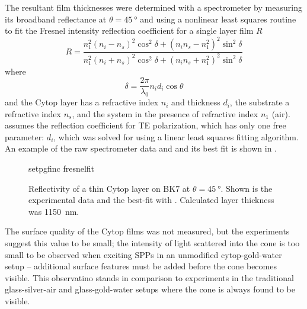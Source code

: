 The resultant film thicknesses were determined with a spectrometer by
measuring its broadband reflectance at $\theta=\SI{45}{\degree}$ and using
a nonlinear least squares routine~\cite{more1977LevAlgImpThe_2} to 
fit the Fresnel intensity reflection coefficient for a single layer
film $R$~\cite{steck2006classical} 
\begin{equation}
 R = \frac{n_1^2(n_i-n_s)^2 \cos^2\delta + (n_i n_s - n_1^2)^2\sin^2\delta}
          {n_1^2(n_i+n_s)^2 \cos^2\delta + (n_i n_s + n_1^2)^2\sin^2\delta}
          \label{eqn:fitfresnel}
\end{equation}
where
\begin{equation}
 \delta = \frac{2\pi}{\lambda_0} n_i d_i \cos \theta
\end{equation}
and the Cytop layer has a refractive index $n_i$ and thickness $d_i$, the
substrate a refractive index $n_s$, and the system in the presence of
refractive index $n_1$ (air).   assumes the
reflection coefficient for TE polarization, which 
 has only one free parameter: $d_i$, which was
solved for using a linear least squares fitting algorithm.
An example of the raw spectrometer data and and its best fit is shown in
.

\begin{figure}
 \centering
 {setpgfinc}
 {fresnelfit}
 \caption{Reflectivity of a thin Cytop layer on BK7 at
 $\theta=\SI{45}{\degree}$.  Shown is the experimental data and the
	best-fit with .  Calculated layer thickness was \SI{1150}{\nano\meter}.}
\label{fig:fresnelfit}
\end{figure}

The surface quality of the Cytop films was not measured, but the
experiments suggest this value to be small; the intensity of light
scattered into the cone is too small to be observed when exciting SPPs in
an unmodified cytop-gold-water setup -- additional surface features must be
added before the cone becomes visible.  This observatino stands in
comparison to experiments in the traditional glass-silver-air and
glass-gold-water setups where the cone is always found to be visible.
